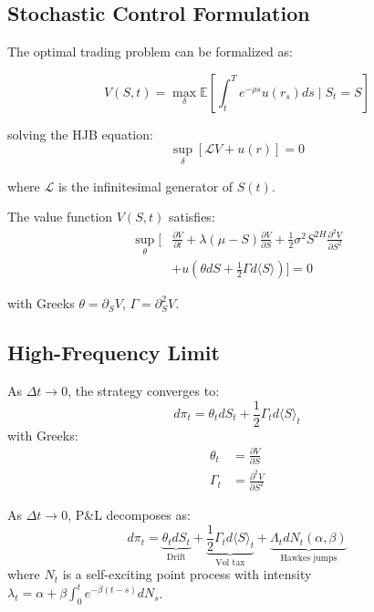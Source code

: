 \documentclass[article]{arithmaxresearch}
\begin{document}
\subsection{Stochastic Control Formulation}

The optimal trading problem can be formalized as:

\begin{equation}
V(S,t) = \max_{\delta} \mathbb{E}\left[ \int_t^T e^{-\rho s} u(r_s) ds \;\bigg|\; S_t = S \right]
\end{equation}

solving the HJB equation:
\begin{equation}
\sup_{\delta} \left[ \mathcal{L}V + u(r) \right] = 0
\end{equation}

where $\mathcal{L}$ is the infinitesimal generator of $S(t)$.

The value function $V(S,t)$ satisfies:
\begin{align}
\sup_{\theta} \bigg[ & \frac{\partial V}{\partial t} + \lambda(\mu - S)\frac{\partial V}{\partial S} + \frac{1}{2}\sigma^2 S^{2H}\frac{\partial^2 V}{\partial S^2} \\
& + u\left(\theta dS + \frac{1}{2}\Gamma d\langle S\rangle\right) \bigg] = 0 \nonumber
\end{align}

with Greeks $\theta = \partial_S V$, $\Gamma = \partial^2_S V$.

\subsection{High-Frequency Limit}

As $\Delta t \to 0$, the strategy converges to:
\begin{equation}
d\pi_t = \theta_t dS_t + \frac{1}{2} \Gamma_t d\langle S \rangle_t
\end{equation}
with Greeks:
\begin{align}
\theta_t &= \frac{\partial V}{\partial S} \\
\Gamma_t &= \frac{\partial^2 V}{\partial S^2}
\end{align}

As $\Delta t \to 0$, P\&L decomposes as:
\begin{equation}
d\pi_t = \underbrace{\theta_t dS_t}_{\text{Drift}} + \underbrace{\frac{1}{2}\Gamma_t d\langle S\rangle_t}_{\text{Vol tax}} + \underbrace{\Lambda_t dN_t(\alpha,\beta)}_{\text{Hawkes jumps}}
\end{equation}
where $N_t$ is a self-exciting point process with intensity $\lambda_t = \alpha + \beta \int_0^t e^{-\beta(t-s)}dN_s$.
\end{document}
